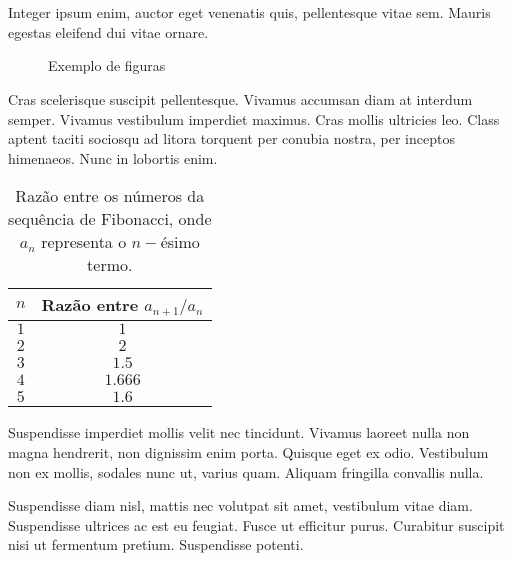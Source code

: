 \section*{}


Integer ipsum enim, auctor eget venenatis quis, pellentesque vitae sem. Mauris egestas eleifend dui vitae ornare.

\begin{figure}[h]
\begin{center}
\caption{ Exemplo de figuras}
\end{center}
\end{figure}

Cras scelerisque suscipit pellentesque. Vivamus accumsan diam at interdum semper. Vivamus vestibulum imperdiet maximus. Cras mollis ultricies leo. Class aptent taciti sociosqu ad litora torquent per conubia nostra, per inceptos himenaeos. Nunc in lobortis enim.

\begin{table}[h!]
    \centering
    \begin{tabular}{|c|c|}
    \hline
         $n$ & Razão entre $a_{n+1}/a_{n}$  \\
    \hline
        $1$ & $1$\\ 
    \hline
         $2$ &  $2$\\
    \hline
        $3$ & $1.5$\\
    \hline
        $4$ & $1.666$\\
        \hline
        $5$ & $1.6$\\
        \hline
    \end{tabular}
    \caption{Razão entre os números da sequência de Fibonacci, onde $a_n$ representa o $n-$ésimo termo.}
\end{table}

Suspendisse imperdiet mollis velit nec tincidunt. Vivamus laoreet nulla non magna hendrerit, non dignissim enim porta. Quisque eget ex odio. Vestibulum non ex mollis, sodales nunc ut, varius quam. Aliquam fringilla convallis nulla.

 Suspendisse diam nisl, mattis nec volutpat sit amet, vestibulum vitae diam. Suspendisse ultrices ac est eu feugiat. Fusce ut efficitur purus. Curabitur suscipit nisi ut fermentum pretium. Suspendisse potenti.
